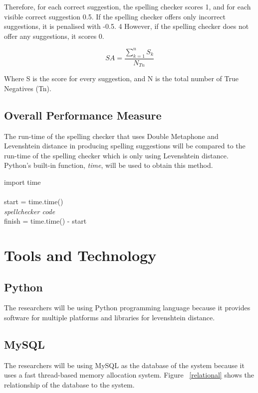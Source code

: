 \documentclass[12pt]{book}
\newcommand\tab[1][1cm]{\hspace*{#1}}
\begin{document}
Therefore, for each correct suggestion, the spelling checker scores 1, and for each visible correct suggestion 0.5. If the spelling checker offers only incorrect suggestions, it is penalised with -0.5. 4 However, if the spelling checker does not offer any suggestions, it scores 0.

\begin{equation}
SA =\dfrac{\sum_{k=1}^{n} S_{k}}{N _{Tn}}
\end{equation}

Where S is the score for every suggestion, and N is the total number of True Negatives (Tn).

\subsection{Overall Performance Measure}
The run-time of the spelling checker that uses Double Metaphone and Levenshtein distance in producing spelling suggestions will be compared to the run-time of the spelling checker which is only using Levenshtein distance. Python’s built-in function, \textit{time}, will be used to obtain this method.
\begin{algorithm}
import time\\
\tab\\
\tab start = time.time()\\
\tab \textit{spellchecker code}\\
\tab finish = time.time() - start

\end{algorithm}

\section{Tools and Technology}
\subsection{Python}

The researchers will be using Python programming language because it provides software for multiple platforms and libraries for levenshtein distance. 

\subsection{MySQL}

The researchers will be using MySQL as the database of the system because it uses a fast thread-based memory allocation system. Figure ~\ref{relational} shows the relationship of the database to the system. 
\end{document}
